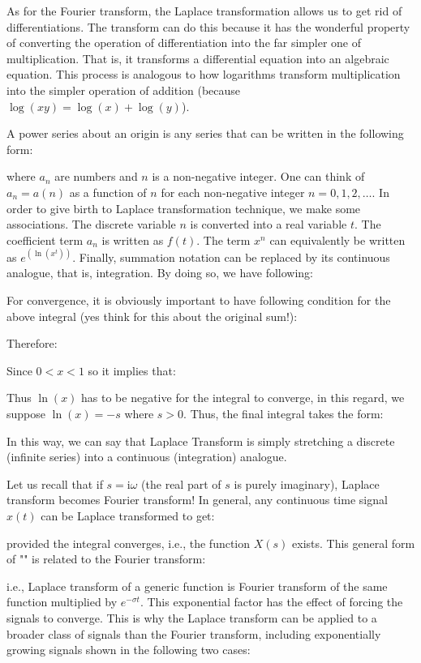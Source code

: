	As for the Fourier transform, the Laplace transformation allows us to get rid of differentiations. The transform can do this because it has the wonderful property of converting the operation of differentiation into the far simpler one of multiplication. That is, it transforms a differential equation into an algebraic equation. This process is analogous to how logarithms transform multiplication into the simpler operation of
addition (because $\log (xy)=\log(x)+\log(y)$).

	A power series about an origin is any series that can be written in the following form:
	
	where $a_n$ are  numbers and $n$ is a non-negative integer. One can think of $a_n = a(n)$ as a function of $n$ for each non-negative integer $n = 0, 1, 2, \ldots$. In order to give birth to Laplace transformation technique, we  make some associations. The discrete variable $n$ is converted into a real variable $t$. The coefficient term $a_n$ is written as $f(t)$. The term $x^n$ can equivalently be written as $e^{(\ln (x^t))}$. Finally, summation notation can be replaced by its continuous analogue, that is, integration. By doing so, we have following:
	 
For convergence, it is obviously important to have following condition for the above integral (yes think for this about the original sum!):
	 
	Therefore:
	 
	Since $0<x<1 $ so it implies that:
	
	Thus $\ln(x)$ has to be negative for the integral to converge, in this regard, we suppose $\ln(x)=-s$ where $s>0$. Thus, the final integral takes the form:
	
	In this way, we can say that Laplace Transform is simply stretching a discrete (infinite series)  into a continuous (integration) analogue. 
	
	Let us recall that if $s=\mathrm{i}\omega$ (the real part of $s$ is purely imaginary), Laplace transform becomes Fourier transform! In general, any continuous time signal $x(t)$ can be Laplace transformed to get:
	
	provided the integral converges, i.e., the function $X(s)$ exists. This general form of "\label{bilateral Laplace transform}" is related to the Fourier transform:
	
	i.e., Laplace transform of a generic function is Fourier transform of the same function multiplied by $e^{-\sigma t}$. This exponential factor has the effect of forcing the signals to converge. This is why the Laplace transform can be applied to a broader class of signals than the Fourier transform, including exponentially growing signals shown in the following two cases:

